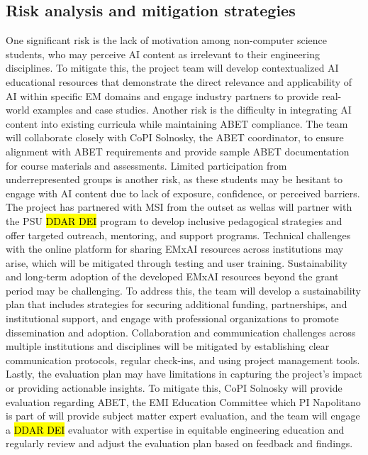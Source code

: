\documentclass[11pt]{article}
\begin{document}
\subsection{Risk analysis and mitigation strategies}
One significant risk is the lack of motivation among non-computer science students, who may perceive AI content as irrelevant to their engineering disciplines. 
To mitigate this, the project team will develop contextualized AI educational resources that demonstrate the direct relevance and applicability of AI within specific EM domains and engage industry partners to provide real-world examples and case studies. 
Another risk is the difficulty in integrating AI content into existing curricula while maintaining ABET compliance. 
The team will collaborate closely with CoPI Solnosky, the ABET coordinator, to ensure alignment with ABET requirements and provide sample ABET documentation for course materials and assessments.
Limited participation from underrepresented groups is another risk, as these students may be hesitant to engage with AI content due to lack of exposure, confidence, or perceived barriers. 
The project has partnered with MSI from the outset as wellas will partner with the PSU \hl{DDAR DEI} program to develop inclusive pedagogical strategies and offer targeted outreach, mentoring, and support programs. 
Technical challenges with the online platform for sharing EMxAI resources across institutions may arise, which will be mitigated through testing and user training.
Sustainability and long-term adoption of the developed EMxAI resources beyond the grant period may be challenging. 
To address this, the team will develop a sustainability plan that includes strategies for securing additional funding, partnerships, and institutional support, and engage with professional organizations to promote dissemination and adoption. 
Collaboration and communication challenges across multiple institutions and disciplines will be mitigated by establishing clear communication protocols, regular check-ins, and using project management tools.
Lastly, the evaluation plan may have limitations in capturing the project's impact or providing actionable insights. 
To mitigate this,
CoPI Solnosky will provide evaluation regarding ABET, the EMI Education Committee which PI Napolitano is part of will provide subject matter expert evaluation, and the team will engage a \hl{DDAR DEI} evaluator with expertise in equitable engineering education and regularly review and adjust the evaluation plan based on feedback and findings. 

\newpage

 
\end{document}
